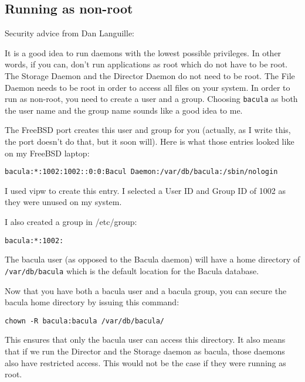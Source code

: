 {\subsection*{Running as non-root}

Security advice from Dan Languille: 

It is a good idea to run daemons with the lowest possible privileges.  In
other words, if you can, don't run applications as root which do  not have to
be root.  The Storage Daemon and the Director Daemon do not need to be root.
The  File Daemon needs to be root in order to access all files on your system.
In order to run as non-root, you need to create a user and a group.  Choosing
{\tt bacula} as both the user name and the group name sounds like a good idea
to me.  

The FreeBSD port creates this user and group for you (actually, as I  write
this, the port doesn't do that, but it soon will). Here is what those  entries
looked like on my FreeBSD laptop: 

\footnotesize
\begin{verbatim}
bacula:*:1002:1002::0:0:Bacul Daemon:/var/db/bacula:/sbin/nologin
\end{verbatim}
\normalsize

I used vipw to create this entry. I selected a User ID and Group ID  of 1002
as they were unused on my system.  

I also created a group in /etc/group:  

\footnotesize
\begin{verbatim}
bacula:*:1002:
\end{verbatim}
\normalsize

The bacula user (as opposed to the Bacula daemon) will have a home  directory
of {\tt /var/db/bacula} which is the  default location for the Bacula
database.  

Now that you have both a bacula user and a bacula group, you can  secure the
bacula home directory by issuing this command: 

\footnotesize
\begin{verbatim}
chown -R bacula:bacula /var/db/bacula/
\end{verbatim}
\normalsize

This ensures that only the bacula user can access this directory.  It also
means that if we run the Director and the Storage daemon  as bacula, those
daemons also have restricted access. This would not be  the case if they were
running as root.  

}
